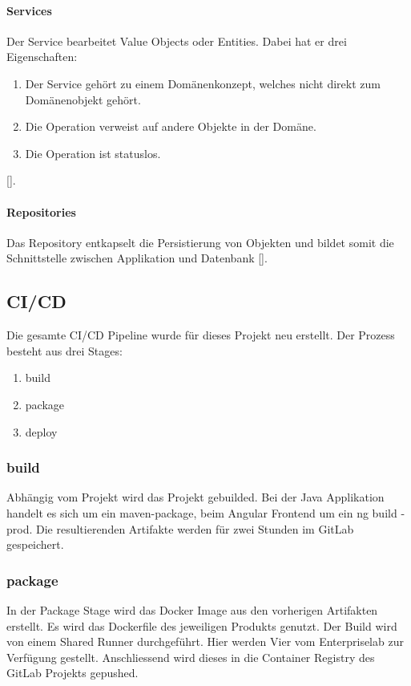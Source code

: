 \paragraph{Services}\label{services}
Der Service bearbeitet Value Objects oder Entities. Dabei hat er drei Eigenschaften: 
\begin{enumerate}
	\item Der Service gehört zu einem Domänenkonzept, welches nicht direkt zum Domänenobjekt gehört.
	\item Die Operation verweist auf andere Objekte in der Domäne.
	\item Die Operation ist statuslos. 
\end{enumerate}
[\cite{domainDrivenDesign}].
\paragraph{Repositories}
Das Repository entkapselt die Persistierung von Objekten und bildet somit die Schnittstelle zwischen Applikation und Datenbank [\cite{domainDrivenDesign}].

\subsection{CI/CD}
Die gesamte \ac{CI/CD} Pipeline wurde für dieses Projekt neu erstellt. Der Prozess besteht aus drei Stages: 
\begin{enumerate}
	\item build
	\item package
	\item deploy
\end{enumerate}

\subsubsection{build}
Abhängig vom Projekt wird das Projekt gebuilded. Bei der Java Applikation handelt es sich um ein \glqq maven-package\grqq{}, beim Angular Frontend um ein \glqq ng build -prod\grqq{}. Die resultierenden Artifakte werden für zwei Stunden im GitLab gespeichert. 
\subsubsection{package}
In der Package Stage wird das Docker Image aus den vorherigen Artifakten erstellt. Es wird das Dockerfile des jeweiligen Produkts genutzt. Der Build wird von einem Shared Runner durchgeführt. Hier werden Vier vom Enterpriselab zur Verfügung gestellt. Anschliessend wird dieses in die Container Registry des GitLab Projekts gepushed. 
